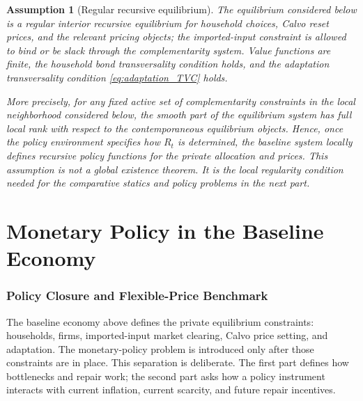 ﻿\documentclass[12pt]{article}
\newtheorem{assumption}{Assumption}
\theoremstyle{remark}
\begin{document}
\begin{assumption}[Regular recursive equilibrium]\label{ass:regular_equilibrium}
The equilibrium considered below is a regular interior recursive equilibrium for household choices,
Calvo reset prices, and the relevant pricing objects; the imported-input constraint is allowed to
bind or be slack through the complementarity system. Value functions are finite, the household bond
transversality condition holds, and the adaptation transversality condition
\eqref{eq:adaptation_TVC} holds.

More precisely, for any fixed active set of complementarity constraints in the local neighborhood
considered below, the smooth part of the equilibrium system has full local rank with respect to the
contemporaneous equilibrium objects. Hence, once the policy environment specifies how $R_t$ is
determined, the baseline system locally defines recursive policy functions for the private
allocation and prices. This assumption is not a global existence theorem. It is the local regularity
condition needed for the comparative statics and policy problems in the next part.
\end{assumption}

\part{Monetary Policy in the Baseline Economy}

\section{Policy Closure and Flexible-Price Benchmark}

The baseline economy above defines the private equilibrium constraints: households, firms,
imported-input market clearing, Calvo price setting, and adaptation. The monetary-policy problem is
introduced only after those constraints are in place. This separation is deliberate. The first part
defines how bottlenecks and repair work; the second part asks how a policy instrument interacts
with current inflation, current scarcity, and future repair incentives.
\end{document}
